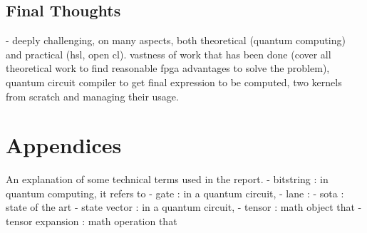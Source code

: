 \documentclass[12pt,oneside,a4paper]{article}
\begin{document}
\subsection{Final Thoughts}
- deeply challenging, on many aspects, both theoretical (quantum computing) and practical (hsl, open cl). vastness of work that has been done (cover all theoretical work to find reasonable fpga advantages to solve the problem), quantum circuit compiler to get final expression to be computed, two kernels from scratch and managing their usage.





\printbibliography[title={\section{References}}]




\section{Appendices}
An explanation of some technical terms used in the report.
- bitstring : in quantum computing, it refers to
- gate : in a quantum circuit,
- lane :
- sota : state of the art
- state vector : in a quantum circuit,
- tensor : math object that
- tensor expansion : math operation that



\end{document}
